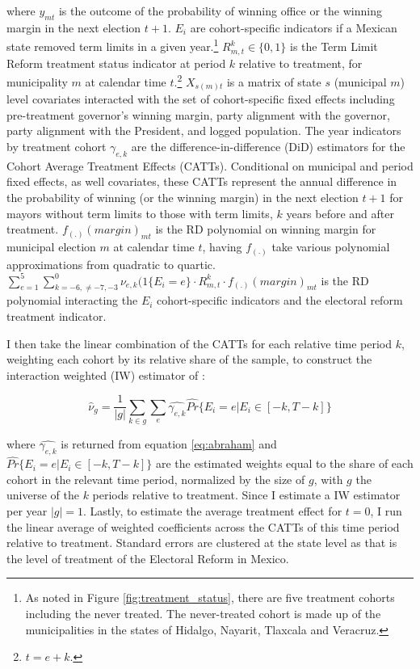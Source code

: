 \documentclass[12pt]{amsart}
\numberwithin{equation}{section}
\theoremstyle{definition}
\theoremstyle{definition}
\theoremstyle{definition}
\begin{document}
where $y_{mt}$ is the outcome of the probability of winning office or the winning margin in the next election $t+1$. $E_i$ are cohort-specific indicators if a Mexican state removed term limits in a given year.\footnote{As noted in Figure \ref{fig:treatment_status}, there are five treatment cohorts including the never treated. The never-treated cohort is made up of the municipalities in the states of Hidalgo, Nayarit, Tlaxcala and Veracruz.} $R^k_{m,t}\in \{0,1\}$  is the Term Limit Reform treatment status indicator at period $k$ relative to treatment, for municipality $m$ at calendar time $t$.\footnote{$t=e+k$.} $X_{s(m)t}$ is a matrix of state $s$ (municipal $m$) level covariates interacted with the set of cohort-specific fixed effects including pre-treatment governor's winning margin, party alignment with the governor, party alignment with the President, and logged population.  The year indicators by treatment cohort  $\gamma_{e,k}$ are the difference-in-difference (DiD) estimators for the Cohort Average Treatment Effects (CATTs). Conditional on municipal and period fixed effects, as well covariates, these CATTs represent the annual difference in the probability of winning (or the winning margin) in the next election $t+1$ for mayors without term limits to those with term limits, $k$ years before and after treatment. $f_{(.)}(margin)_{mt}$ is the RD polynomial on winning margin for municipal election $m$ at calendar time $t$, having $f_{(.)}$ take various polynomial approximations from quadratic to quartic. $\sum^5_{e=1} \sum^{0}_{k=-6, \neq {-7,-3}} \nu_{e,k}(1\{E_i=e\} \cdot R^k_{m,t} \cdot  f_{(.)}(margin)_{mt}  $ is the RD polynomial interacting the $E_i$ cohort-specific indicators and the electoral reform treatment indicator. 

I then take the linear combination of the CATTs for each relative time period $k$, weighting each cohort by its relative share of the sample, to construct the interaction weighted (IW) estimator of \citet{abraham_sun_2020}:   

\begin{equation}
\hat{\nu}_g=\frac{1}{|g|}\sum_{k \in g}\sum_e \hat{\gamma_{e,k}} \hat{Pr}\{E_i=e | E_i \in [-k, T-k]\}	
\end{equation}
  
where $\hat{\gamma_{e,k}}$ is returned from equation \ref{eq:abraham} and $\hat{Pr}\{E_i=e | E_i \in [-k, T-k]\}$  are the estimated weights equal to the share of each cohort in the relevant time period, normalized by the size of  $g$, with $g$ the universe of the $k$ periods relative to treatment. Since I estimate a IW estimator per year $|g|=1$. Lastly, to estimate the average treatment effect for $t=0$, I run the linear average of weighted coefficients across the CATTs of this time period relative to treatment.  Standard errors are clustered at the state level as that is the level of treatment of the Electoral Reform in Mexico. 
\end{document}
